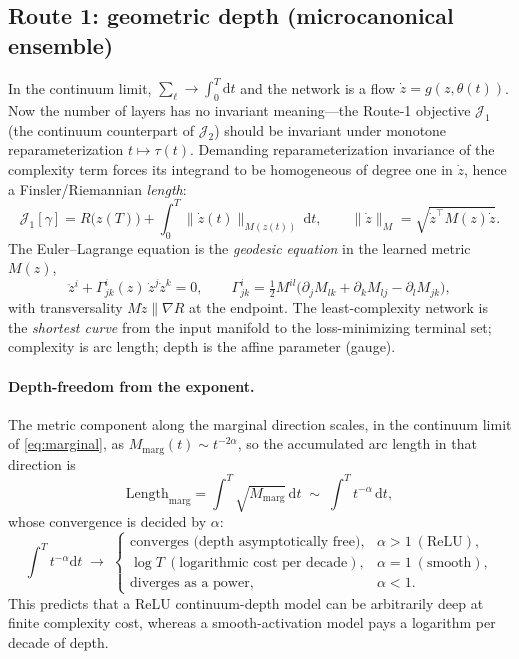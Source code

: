 \documentclass[11pt]{article}
\theoremstyle{definition}
\newcommand{\J}{\mathcal{J}}
\newcommand{\dd}{\mathrm{d}}
\newcommand{\half}{\tfrac{1}{2}}
\begin{document}
\subsection{Route 1: geometric depth (microcanonical ensemble)}
\label{sec:route1}

In the continuum limit, $\sum_\ell\to\int_0^T\dd t$ and the network is a flow
$\dot z=g(z,\theta(t))$. Now the number of layers has no invariant meaning---the Route-1
objective $\J_1$ (the continuum counterpart of $\J_2$) should be invariant under monotone
reparameterization $t\mapsto\tau(t)$. Demanding reparameterization invariance of the
complexity term forces its integrand to be homogeneous of degree one in $\dot z$, hence a
Finsler/Riemannian \emph{length}:
\begin{equation}
\boxed{\;\J_1[\gamma]=R\big(z(T)\big)+\int_0^T\|\dot z(t)\|_{M(z(t))}\,\dd t,\qquad
\|\dot z\|_M=\sqrt{\dot z^\top M(z)\dot z}.\;}
\label{eq:route1-obj}
\end{equation}
The Euler--Lagrange equation is the \emph{geodesic equation} in the learned metric $M(z)$,
\begin{equation}
\ddot z^i+\Gamma^i_{jk}(z)\,\dot z^j\dot z^k=0,
\qquad
\Gamma^i_{jk}=\half M^{il}\big(\partial_j M_{lk}+\partial_k M_{lj}-\partial_l M_{jk}\big),
\label{eq:geodesic}
\end{equation}
with transversality $M\dot z\parallel\nabla R$ at the endpoint. The least-complexity network
is the \emph{shortest curve} from the input manifold to the loss-minimizing terminal set;
complexity is arc length; depth is the affine parameter (gauge).

\paragraph{Depth-freedom from the exponent.} The metric component along the marginal
direction scales, in the continuum limit of \eqref{eq:marginal}, as
$M_{\mathrm{marg}}(t)\sim t^{-2\alpha}$, so the accumulated arc length in that direction is
\begin{equation}
\mathrm{Length}_{\mathrm{marg}}=\int^T\!\sqrt{M_{\mathrm{marg}}}\,\dd t\;\sim\;\int^T t^{-\alpha}\,\dd t,
\label{eq:arclength}
\end{equation}
whose convergence is decided by $\alpha$:
\begin{equation}
\int^T t^{-\alpha}\dd t\;\longrightarrow\;
\begin{cases}
\text{converges (depth asymptotically free)}, & \alpha>1\ (\text{ReLU}),\\[2pt]
\log T\ (\text{logarithmic cost per decade}), & \alpha=1\ (\text{smooth}),\\[2pt]
\text{diverges as a power}, & \alpha<1.
\end{cases}
\label{eq:depth-freedom}
\end{equation}
This predicts that a ReLU continuum-depth model can be arbitrarily deep at finite complexity
cost, whereas a smooth-activation model pays a logarithm per decade of depth.
\end{document}
